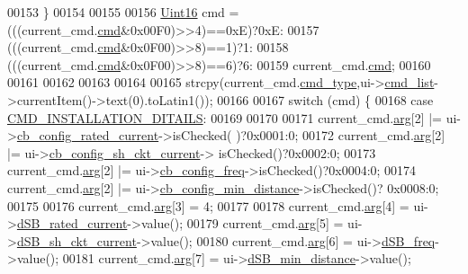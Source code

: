 \begin{DoxyCode}
00153    \}
00154 
00155 
00156     \hyperlink{a00004_aae7407b021d43f7193a81a58cfb3e297}{Uint16} cmd = (((current\_cmd.\hyperlink{a00004_af20664dc9ca2b752c73d524edee0e07a}{cmd}&0x00F0)>>4)==0xE)?0xE:
00157                  (((current\_cmd.\hyperlink{a00004_af20664dc9ca2b752c73d524edee0e07a}{cmd}&0x0F00)>>8)==1)?1:
00158                  (((current\_cmd.\hyperlink{a00004_af20664dc9ca2b752c73d524edee0e07a}{cmd}&0x0F00)>>8)==6)?6:                
00159                  current\_cmd.\hyperlink{a00004_af20664dc9ca2b752c73d524edee0e07a}{cmd};
00160 
00161 
00162 
00163 
00164 
00165     strcpy(current\_cmd.\hyperlink{a00004_a217dc0db956d3bb46d8573960cb7359a}{cmd\_type},ui->\hyperlink{a00080_aa66ece71395b435e915d384fb63bac1d}{cmd\_list}->currentItem()->text(0).toLatin1());
00166 
00167     \textcolor{keywordflow}{switch} (cmd) \{
00168     \textcolor{keywordflow}{case} \hyperlink{a00086_af91ff280feea1f52e3bdd7f0f556d153}{CMD\_INSTALLATION\_DITAILS}:
00169 
00170 
00171             current\_cmd.\hyperlink{a00004_a56e6c2d7315d0ae60a51e8b140c9cfe4}{arg}[2]         |= ui->\hyperlink{a00080_af4863849ff58931ae3a38aa5b40b8158}{cb\_config\_rated\_current}->isChecked(
      )?0x0001:0;
00172             current\_cmd.\hyperlink{a00004_a56e6c2d7315d0ae60a51e8b140c9cfe4}{arg}[2]         |= ui->\hyperlink{a00080_a541de6e510677e572ab233f7ecc25e2c}{cb\_config\_sh\_ckt\_current}->
      isChecked()?0x0002:0;
00173             current\_cmd.\hyperlink{a00004_a56e6c2d7315d0ae60a51e8b140c9cfe4}{arg}[2]         |= ui->\hyperlink{a00080_a8f501acefacd6343a4ec99a67172f256}{cb\_config\_freq}->isChecked()?0x0004:0;
00174             current\_cmd.\hyperlink{a00004_a56e6c2d7315d0ae60a51e8b140c9cfe4}{arg}[2]         |= ui->\hyperlink{a00080_a6b0d09f3b380fdb810d3da3f5208ccf5}{cb\_config\_min\_distance}->isChecked()?
      0x0008:0;
00175 
00176             current\_cmd.\hyperlink{a00004_a56e6c2d7315d0ae60a51e8b140c9cfe4}{arg}[3]          = 4;
00177 
00178             current\_cmd.\hyperlink{a00004_a56e6c2d7315d0ae60a51e8b140c9cfe4}{arg}[4]          = ui->\hyperlink{a00080_ab6d7c3a292c79cd73aff8735df48d30e}{dSB\_rated\_current}->value();
00179             current\_cmd.\hyperlink{a00004_a56e6c2d7315d0ae60a51e8b140c9cfe4}{arg}[5]          = ui->\hyperlink{a00080_aab5fcfd5ceedb9c4e853139113f5c753}{dSB\_sh\_ckt\_current}->value();
00180             current\_cmd.\hyperlink{a00004_a56e6c2d7315d0ae60a51e8b140c9cfe4}{arg}[6]          = ui->\hyperlink{a00080_abd528de839feccc001dc62b3aecddc9f}{dSB\_freq}->value();
00181             current\_cmd.\hyperlink{a00004_a56e6c2d7315d0ae60a51e8b140c9cfe4}{arg}[7]          = ui->\hyperlink{a00080_a01c23085590f4947828948bbd9f50cc7}{dSB\_min\_distance}->value();

\end{DoxyCode}
